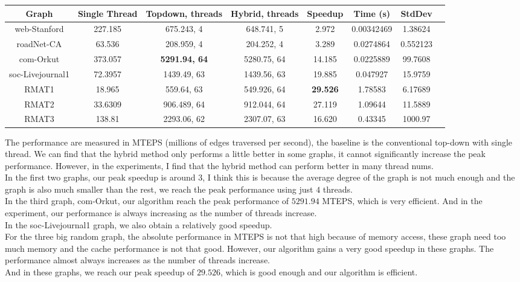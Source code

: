 \documentclass[10pt,twocolumn,letterpaper]{article}
\begin{document}
\begin{strip}
\centering
\begin{tabular}{@{}c|ccccccc@{}}
\toprule
Graph            & Single Thread  & Topdown, threads     & Hybrid, threads      & Speedup & Time (s) & StdDev \\ \midrule
web-Stanford     & 227.185 & 675.243, 4  & 648.741, 5  & 2.972 & 0.00342469 & 1.38624    \\
roadNet-CA       & 63.536  & 208.959, 4  & 204.252, 4  & 3.289  & 0.0274864 & 0.552123 \\
com-Orkut        & 373.057 & \textbf{5291.94, 64} & 5280.75, 64 & 14.185 & 0.0225889 & 99.7608 \\
soc-Livejournal1 & 72.3957 & 1439.49, 63 & 1439.56, 63 & 19.885 & 0.047927 & 15.9759 \\
RMAT1            & 18.965 & 559.64, 63  & 549.926, 64 & \textbf{29.526} & 1.78583 & 6.17689  \\
RMAT2            & 33.6309 &    906.489, 64         &   912.044, 64          &   27.119 & 1.09644 & 11.5889      \\
RMAT3            &    138.81     & 2293.06, 62            & 2307.07, 63            &16.620 & 0.43345 & 1000.97         \\ \bottomrule
\end{tabular}

\end{strip}

The performance are measured in MTEPS (millions of edges traversed per second), the baseline is the conventional top-down with single thread. We can find that the hybrid method only performs a little better in some graphs, it cannot significantly increase the peak performance. However, in the experiments, I find that the hybrid method can perform better in many thread nums.\\
In the first two graphs, our peak speedup is around $3$, I think this is because the average degree of the graph is not much enough and the graph is also much smaller than the rest, we reach the peak performance using just $4$ threads.\\
In the third graph, com-Orkut, our algorithm reach the peak performance of $5291.94$ MTEPS, which is very efficient. And in the experiment, our performance is always increasing as the number of threads increase.\\
In the soc-Livejournal1 graph, we also obtain a relatively good speedup.\\
For the three big random graph, the absolute performance in MTEPS is not that high because of memory access, these graph need too much memory and the cache performance is not that good. However, our algorithm gains a very good speedup in these graphs. The performance almost always increases as the number of threads increase.\\
And in these graphs, we reach our peak speedup of $29.526$, which is good enough and our algorithm is efficient.
\end{document}
